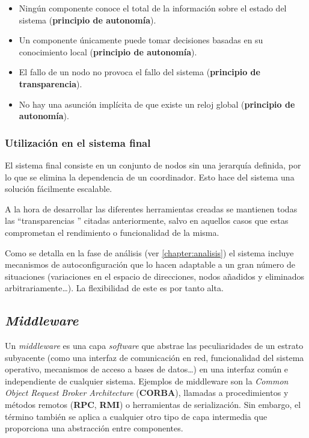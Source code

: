 \begin{itemize}
  \item Ningún componente conoce el total de la información sobre el estado del sistema (\textbf{principio de autonomía}).
  \item Un componente únicamente puede tomar decisiones basadas en su conocimiento local (\textbf{principio de autonomía}).
  \item El fallo de un nodo no provoca el fallo del sistema (\textbf{principio de transparencia}).
  \item No hay una asunción implícita de que existe un reloj global (\textbf{principio de autonomía}).
\end{itemize}

\subsubsection{Utilización en el sistema final}

El sistema final consiste en un conjunto de nodos sin una jerarquía definida, por lo que se elimina la dependencia de un coordinador. Esto hace del sistema una solución fácilmente escalable.

A la hora de desarrollar las diferentes herramientas creadas se mantienen todas las  ``transparencias '' citadas anteriormente, salvo en aquellos casos que estas comprometan el rendimiento o funcionalidad de la misma.

Como se detalla en la fase de análisis (ver \ref{chapter:analisis}) el sistema incluye mecanismos de autoconfiguración que lo hacen adaptable a un gran número de situaciones (variaciones en el espacio de direcciones, nodos añadidos y eliminados arbitrariamente\dots). La flexibilidad de este es por tanto alta.


\subsection{\textit{Middleware}}
\label{teoria:middleware}

Un \textit{middleware} es una capa \textit{software} que abstrae las peculiaridades de un estrato subyacente (como una interfaz de comunicación en red, funcionalidad del sistema operativo, mecanismos de acceso a bases de datos\dots) en una interfaz común e independiente de cualquier sistema. Ejemplos de middleware son la \textit{Common Object Request Broker Architecture} (\textbf{CORBA}), llamadas a procedimientos y métodos remotos (\textbf{RPC}, \textbf{RMI}) o herramientas de serialización. Sin embargo, el término también se aplica a cualquier otro tipo de capa intermedia que proporciona una abstracción entre componentes.

